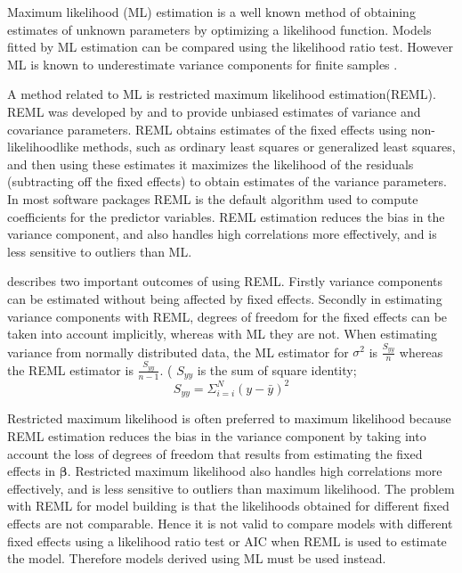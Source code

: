 \documentclass[12pt, a4paper]{report}
\theoremstyle{plain}
\theoremstyle{definition}
\theoremstyle{remark}
\begin{document}
Maximum likelihood (ML) estimation is a well known method of
obtaining estimates of unknown parameters by optimizing a
likelihood function. Models fitted by ML estimation can be
compared using the likelihood ratio test. However ML is known to
underestimate variance components for finite samples \citep{Demi}.



A method related to ML is restricted maximum likelihood
estimation(REML). REML was developed by \citet*{PT71} and
\citet{Harville} to provide unbiased estimates of variance and
covariance parameters. REML obtains estimates of the fixed effects
using non-likelihoodlike methods, such as ordinary least squares
or generalized least squares, and then using these estimates it
maximizes the likelihood of the residuals (subtracting off the
fixed effects) to obtain estimates of the variance parameters. In
most software packages REML is the default algorithm used to
compute coefficients for the predictor variables. REML estimation
reduces the bias in the variance component, and also handles high
correlations more effectively, and is less sensitive to outliers
than ML.

\citet{McCullSearle} describes two important outcomes of using
REML. Firstly variance components can be estimated without being
affected by fixed effects. Secondly in estimating variance
components with REML, degrees of freedom for the fixed effects can
be taken into account implicitly, whereas with ML they are not.
When estimating variance from normally distributed data, the ML
estimator for $\sigma^{2}$ is $\frac{S_{yy}}{n}$ whereas the REML
estimator is $\frac{S_{yy}}{n-1}$. ( $S_{yy}$ is the sum of square
identity;
\begin{equation}
S_{yy} = \Sigma_{i=i}^{N} (y-\bar{y})^{2}
\end{equation}

Restricted maximum likelihood is often preferred to maximum likelihood because REML estimation reduces the bias in the variance component by taking into account the loss of degrees of freedom that results
from estimating the fixed effects in $\boldsymbol{\beta}$. Restricted maximum likelihood also handles high correlations more effectively, and is less sensitive to outliers than maximum likelihood.  The problem with REML for model building is that the likelihoods obtained for different fixed effects are not comparable. Hence it is not valid to compare models with different fixed effects using a likelihood ratio test or AIC when REML is used to
estimate the model. Therefore models derived using ML must be used instead.
\end{document}
